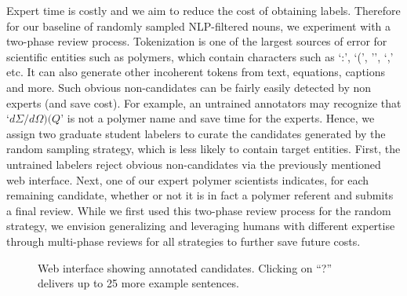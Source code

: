 Expert time is costly and we aim to reduce the cost of obtaining labels.
Therefore for our baseline of randomly sampled NLP-filtered nouns, we experiment with a two-phase review process.
Tokenization is one of the largest sources of error for scientific entities such as polymers, which contain characters such as `:', `(',
'\textendash', `,' etc. It can also generate other incoherent tokens from text, equations, captions and more.
Such obvious non-candidates can be fairly easily detected by non experts (and save cost).
For example, an untrained annotators may recognize that `$d\Sigma/d\Omega)(Q$' is not a polymer name and save time for the experts.
Hence, we assign two graduate student labelers to curate the candidates generated by the random sampling strategy, which is less likely to contain target entities.
First, the untrained labelers reject obvious non-candidates via the previously mentioned web interface. 
Next, one of our expert polymer scientists indicates, for each remaining
candidate, whether or not it is in fact a polymer referent and submits a final review.
While we first used this two-phase review process for the random strategy, we envision generalizing and leveraging humans with different expertise through multi-phase reviews for all strategies to further save future costs.


\begin{figure}
\centering
{}
\caption{\label{fig:polyner} Web interface showing annotated candidates.
Clicking on ``?'' delivers up to 25 more example sentences.
}
\end{figure}

